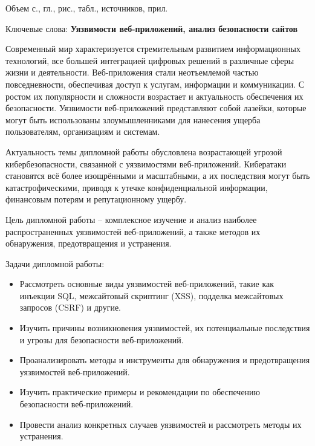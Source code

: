 \documentclass[a4paper,12pt]{diplom}
\begin{document}
	Объем  с.,  гл.,  рис.,
	 табл.,  источников,  прил.
	
	\medskip
	
	Ключевые слова: \textbf{Уязвимости веб-приложений, анализ безопасности сайтов}
	
	\medskip
	
	
	\tableofcontents[Содержание]
	
	
	
	
	Современный мир характеризуется стремительным развитием информационных технологий, все большей интеграцией цифровых решений в различные сферы жизни и деятельности. Веб-приложения стали неотъемлемой частью повседневности, обеспечивая доступ к услугам, информации и коммуникации. С ростом их популярности и сложности возрастает и актуальность обеспечения их безопасности. Уязвимости веб-приложений представляют собой лазейки, которые могут быть использованы злоумышленниками для нанесения ущерба пользователям, организациям и системам.
	
	Актуальность темы дипломной работы обусловлена возрастающей угрозой кибербезопасности, связанной с уязвимостями веб-приложений. Кибератаки становятся всё более изощрёнными и масштабными, а их последствия могут быть катастрофическими, приводя к утечке конфиденциальной информации, финансовым потерям и репутационному ущербу. 
	
	Цель дипломной работы – комплексное изучение и анализ наиболее распространенных уязвимостей веб-приложений, а также методов их обнаружения, предотвращения и устранения.
	
	Задачи дипломной работы:
	
	\begin{itemize}
		\item Рассмотреть основные виды уязвимостей веб-приложений, такие как инъекции SQL, межсайтовый скриптинг (XSS), подделка межсайтовых запросов (CSRF) и другие.
		\item Изучить причины возникновения уязвимостей, их потенциальные последствия и угрозы для безопасности веб-приложений.
		\item Проанализировать методы и инструменты для обнаружения и предотвращения уязвимостей веб-приложений.
		\item Изучить практические примеры и рекомендации по обеспечению безопасности веб-приложений.
		\item Провести анализ конкретных случаев уязвимостей и рассмотреть методы их устранения.
	\end{itemize}
	
\end{document}

